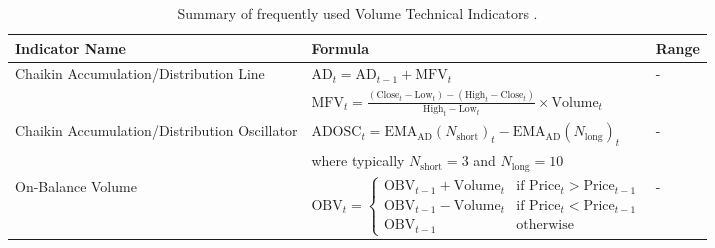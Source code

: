 \begin{table}[htb!]
\centering
\footnotesize
\caption{Summary of frequently used Volume Technical Indicators \cite{jansen_machine_2020}.}
\label{Tables:VolumeIndicators}
\begin{tabularx}{\textwidth}{@{}lXl@{}}
\toprule
\textbf{Indicator Name} & \textbf{Formula} & \textbf{Range} \\
\midrule
Chaikin Accumulation/Distribution Line & $\text{AD}_t = \text{AD}_{t-1} + \text{MFV}_t$ & - \\
\addlinespace
& $\text{MFV}_t = \frac{(\text{Close}_t - \text{Low}_t) - (\text{High}_t - \text{Close}_t)}{\text{High}_t - \text{Low}_t} \times \text{Volume}_t$ & \\
\addlinespace
Chaikin Accumulation/Distribution Oscillator & $\text{ADOSC}_t = \text{EMA}_\text{AD}(N_{\text{short}})_t - \text{EMA}_\text{AD}(N_{\text{long}})_t$ & - \\
\addlinespace
& where typically $N_{\text{short}} = 3$ and $N_{\text{long}} = 10$ & \\
\addlinespace
On-Balance Volume & $\text{OBV}_t =
\begin{cases}
\text{OBV}_{t-1} + \text{Volume}_t & \text{if } \text{Price}_t > \text{Price}_{t-1} \\
\text{OBV}_{t-1} - \text{Volume}_t & \text{if } \text{Price}_t < \text{Price}_{t-1} \\
\text{OBV}_{t-1} & \text{otherwise}
\end{cases}$ & - \\
\bottomrule
\end{tabularx}
\end{table}